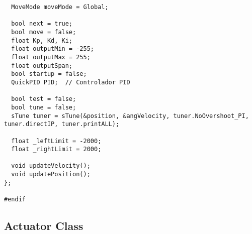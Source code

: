 \begin{verbatim}
  MoveMode moveMode = Global;

  bool next = true;
  bool move = false;
  float Kp, Kd, Ki;
  float outputMin = -255;
  float outputMax = 255;
  float outputSpan;
  bool startup = false;
  QuickPID PID;  // Controlador PID

  bool test = false;
  bool tune = false;
  sTune tuner = sTune(&position, &angVelocity, tuner.NoOvershoot_PI, tuner.directIP, tuner.printALL);

  float _leftLimit = -2000;
  float _rightLimit = 2000;

  void updateVelocity();
  void updatePosition();
};

#endif
\end{verbatim}

\subsection{Actuator Class}
